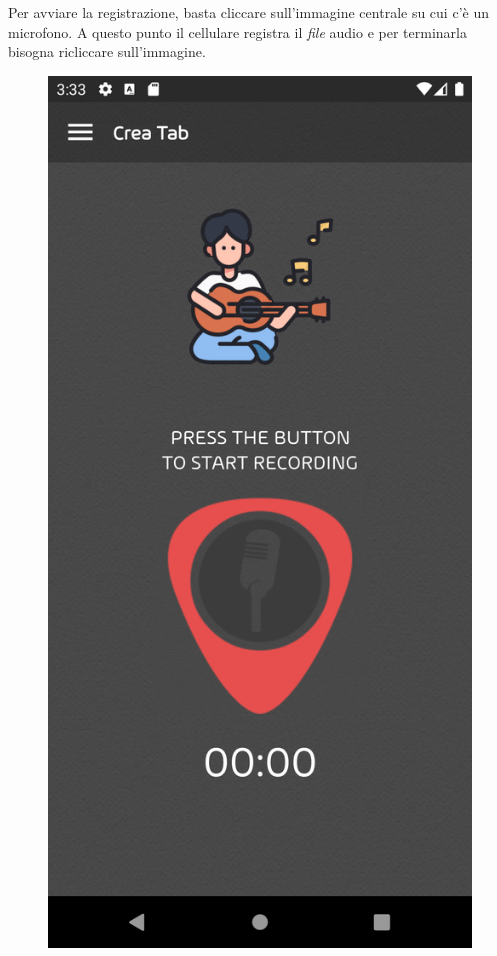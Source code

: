 \newline
Per avviare la registrazione, basta cliccare sull'immagine centrale su cui c'è un microfono. A questo punto il cellulare registra il \textit{file} audio e per terminarla bisogna ricliccare sull'immagine.
\begin{figure}[H]
	\centering
	\includegraphics[scale=0.10]{./images/img18.png}

\end{figure}
